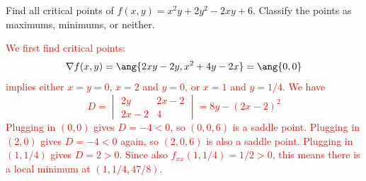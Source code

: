 \documentclass[12pt,reqno]{amsart}
\begin{document}
\prob Find all critical points of $f(x,y) = x^2y+2y^2-2xy+6$. Classify the points as maximums, minimums, or neither.

\bigskip
\textcolor{red}{We first find critical points:
	\[\nabla f(x,y) = \ang{ 2xy - 2y, x^2+4y-2x} = \ang{0,0}
	\]
implies either $x=y=0$, $x=2$ and $y=0$, or $x=1$ and $y=1/4$. We have
	\[D = \begin{vmatrix} 2y & 2x-2 \\ 2x-2 & 4 \end{vmatrix} = 8y - (2x-2)^2
	\]
Plugging in $(0,0)$ gives $D = -4 < 0$, so $(0,0,6)$ is a saddle point. Plugging in $(2,0)$ gives $D=-4<0$ again, so $(2,0,6)$ is also a saddle point. Plugging in $(1,1/4)$ gives $D=2>0$. Since also $f_{xx}(1,1/4)=1/2 >0$, this means there is a local minimum at $(1,1/4,47/8)$.}
\end{document}
